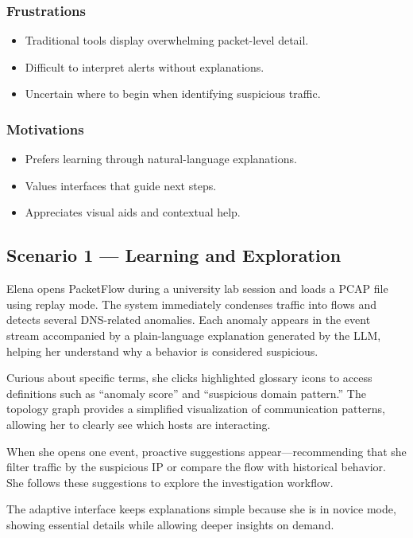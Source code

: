 \documentclass[
    11pt, 
    a4paper, 
    parskip=half, 
    headsepline,       %
    DIV=12             %
]{scrartcl}
\begin{document}
\subsubsection*{Frustrations}
\begin{itemize}
    \item Traditional tools display overwhelming packet-level detail.
    \item Difficult to interpret alerts without explanations.
    \item Uncertain where to begin when identifying suspicious traffic.
\end{itemize}

\subsubsection*{Motivations}
\begin{itemize}
    \item Prefers learning through natural-language explanations.
    \item Values interfaces that guide next steps.
    \item Appreciates visual aids and contextual help.
\end{itemize}

\subsection*{Scenario 1 --- Learning and Exploration}
Elena opens PacketFlow during a university lab session and loads a PCAP file using replay mode. The system immediately condenses traffic into flows and detects several DNS-related anomalies. Each anomaly appears in the event stream accompanied by a plain-language explanation generated by the LLM, helping her understand why a behavior is considered suspicious.

Curious about specific terms, she clicks highlighted glossary icons to access definitions such as ``anomaly score'' and ``suspicious domain pattern.'' The topology graph provides a simplified visualization of communication patterns, allowing her to clearly see which hosts are interacting.

When she opens one event, proactive suggestions appear---recommending that she filter traffic by the suspicious IP or compare the flow with historical behavior. She follows these suggestions to explore the investigation workflow.

The adaptive interface keeps explanations simple because she is in novice mode, showing essential details while allowing deeper insights on demand.
\end{document}
